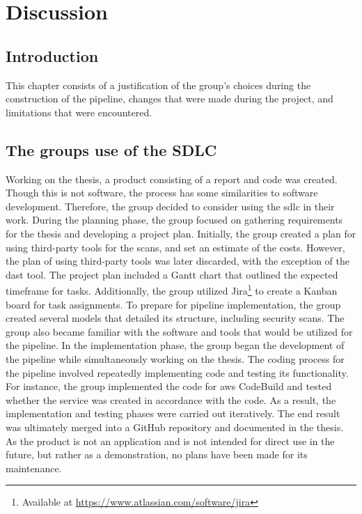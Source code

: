 \chapter{Discussion}
\section{Introduction}
This chapter consists of a justification of the group's choices during the construction of the pipeline, changes that were made during the project, and limitations that were encountered.  


\section{The groups use of the SDLC} %
Working on the thesis, a product consisting of a report and code was created. Though this is not software, the process has some similarities to software development. Therefore, the group decided to consider using the \acrshort{sdlc} in their work.
During the planning phase, the group focused on gathering requirements for the thesis and developing a project plan. Initially, the group created a plan for using third-party tools for the scans, and set an estimate of the costs. However, the plan of using third-party tools was later discarded, with the exception of the \acrshort{dast} tool. The project plan included a Gantt chart that outlined the expected timeframe for tasks. Additionally, the group utilized Jira\footnote{Available at \url{https://www.atlassian.com/software/jira}} to create a Kanban board for task assignments. To prepare for pipeline implementation, the group created several models that detailed its structure, including security scans. The group also became familiar with the software and tools that would be utilized for the pipeline.
In the implementation phase, the group began the development of the pipeline while simultaneously working on the thesis. The coding process for the pipeline involved repeatedly implementing code and testing its functionality. For instance, the group implemented the code for \acrshort{aws} CodeBuild and tested whether the service was created in accordance with the code. As a result, the implementation and testing phases were carried out iteratively.
The end result was ultimately merged into a GitHub repository and documented in the thesis. As the product is not an application and is not intended for direct use in the future, but rather as a demonstration, no plans have been made for its maintenance. 

